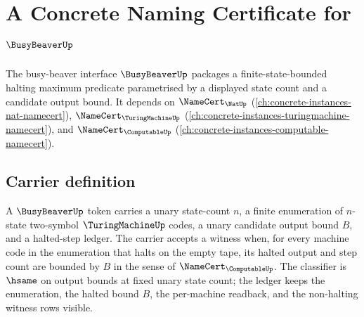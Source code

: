 \chapter{A Concrete Naming Certificate for $\BusyBeaverUp$}
\label{ch:concrete-instances-busybeaver-namecert}

The busy-beaver interface $\BusyBeaverUp$ packages a finite-state-bounded halting maximum predicate parametrised by a displayed state count and a candidate output bound. It depends on $\NameCert_{\NatUp}$ (\autoref{ch:concrete-instances-nat-namecert}), $\NameCert_{\TuringMachineUp}$ (\autoref{ch:concrete-instances-turingmachine-namecert}), and $\NameCert_{\ComputableUp}$ (\autoref{ch:concrete-instances-computable-namecert}).

\section{Carrier definition}
\label{sec:busybeaver-carrier}

A $\BusyBeaverUp$ token carries a unary state-count $n$, a finite enumeration of $n$-state two-symbol $\TuringMachineUp$ codes, a unary candidate output bound $B$, and a halted-step ledger. The carrier accepts a witness when, for every machine code in the enumeration that halts on the empty tape, its halted output and step count are bounded by $B$ in the sense of $\NameCert_{\ComputableUp}$. The classifier is $\hsame$ on output bounds at fixed unary state count; the ledger keeps the enumeration, the halted bound $B$, the per-machine readback, and the non-halting witness rows visible.

